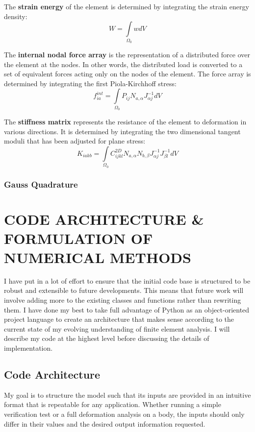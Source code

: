 \documentclass[]{spie}  %
\begin{document}
The \textbf{strain energy} of the element is determined by integrating the strain energy density:
\begin{equation}
\label{eq: strain energy}
W = \int\limits_{\Omega_0} w dV
\end{equation}

The \textbf{internal nodal force array} is the representation of a distributed force over the element at the nodes. In other words, the distributed load is converted to a set of equivalent forces acting only on the nodes of the element. The force array is determined by integrating the first Piola-Kirchhoff stress:
\begin{equation}
\label{eq: internal nodal force array}
f_{ia}^{int} = \int\limits_{\Omega_0} P_{ij} N_{a,\alpha} J_{\alpha j}^{-1} dV
\end{equation}

The \textbf{stiffness matrix} represents the resistance of the element to deformation in various directions. It is determined by integrating the two dimensional tangent moduli that has been adjusted for plane stress:
\begin{equation}
\label{eq: stiffness matrix}
K_{iakb} = \int\limits_{\Omega_0} C_{ijkl}^{2D} N_{a,\alpha} N_{b,\beta} J_{\alpha j}^{-1} J_{\beta l}^{-1} dV
\end{equation}

\subsubsection{Gauss Quadrature}


\section{CODE ARCHITECTURE \& FORMULATION OF NUMERICAL METHODS} 

I have put in a lot of effort to ensure that the initial code base is structured to be robust and extensible to future developments. This means that future work will involve adding more to the existing classes and functions rather than rewriting them. I have done my best to take full advantage of Python as an object-oriented project language to create an architecture that makes sense according to the current state of my evolving understanding of finite element analysis. I will describe my code at the highest level before discussing the details of implementation.

\subsection{Code Architecture}
My goal is to structure the model such that its inputs are provided in an intuitive format that is repeatable for any application. Whether running a simple verification test or a full deformation analysis on a body, the inputs should only differ in their values and the desired output information requested.
\end{document}
